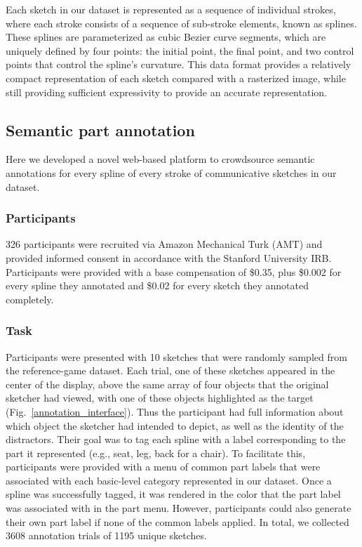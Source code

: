\documentclass[10pt,letterpaper]{article}
\begin{document}
Each sketch in our dataset is represented as a sequence of individual strokes, where each stroke consists of a sequence of sub-stroke elements, known as splines. 
These splines are parameterized as cubic Bezier curve segments, which are uniquely defined by four points: the initial point, the final point, and two control points that control the spline's curvature.
This data format provides a relatively compact representation of each sketch compared with a rasterized image, while still providing sufficient expressivity to provide an accurate representation. 

\subsection{Semantic part annotation}

Here we developed a novel web-based platform to crowdsource semantic annotations for every spline of every stroke of communicative sketches in our dataset. 

\subsubsection{Participants}
326 participants were recruited via Amazon Mechanical Turk (AMT) and provided informed consent in accordance with the Stanford University IRB. 
Participants were provided with a base compensation of \$0.35, plus \$0.002 for every spline they annotated and \$0.02 for every sketch they annotated completely. 

\subsubsection{Task}
Participants were presented with 10 sketches that were randomly sampled from the reference-game dataset. 
Each trial, one of these sketches appeared in the center of the display, above the same array of four objects that the original sketcher had viewed, with one of these objects highlighted as the target (Fig.~\ref{annotation_interface}). 
Thus the participant had full information about which object the sketcher had intended to depict, as well as the identity of the distractors. 
Their goal was to tag each spline with a label corresponding to the part it represented (e.g., seat, leg, back for a chair). 
To facilitate this, participants were provided with a menu of common part labels that were associated with each basic-level category represented in our dataset. 
Once a spline was successfully tagged, it was rendered in the color that the part label was associated with in the part menu. 
However, participants could also generate their own part label if none of the common labels applied.
In total, we collected 3608 annotation trials of 1195 unique sketches.
\end{document}
